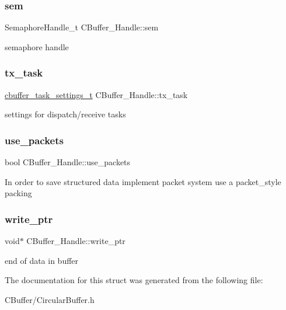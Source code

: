 \subsubsection{\texorpdfstring{sem}{sem}}
{\footnotesize\ttfamily Semaphore\+Handle\+\_\+t C\+Buffer\+\_\+\+Handle\+::sem}

semaphore handle \mbox{\label{structCBuffer__Handle_acf4f92865eae15d0c64e94550bb0ac9a}} 
\subsubsection{\texorpdfstring{tx\+\_\+task}{tx\_task}}
{\footnotesize\ttfamily \hyperlink{structCBuffer__tasks}{cbuffer\+\_\+task\+\_\+settings\+\_\+t} C\+Buffer\+\_\+\+Handle\+::tx\+\_\+task}

settings for dispatch/receive tasks \mbox{\label{structCBuffer__Handle_ad6156a0a6134052e1620d8cd9fb5154b}} 
\subsubsection{\texorpdfstring{use\+\_\+packets}{use\_packets}}
{\footnotesize\ttfamily bool C\+Buffer\+\_\+\+Handle\+::use\+\_\+packets}

In order to save structured data implement packet system use a packet\+\_\+style packing \mbox{\label{structCBuffer__Handle_a301255119721b1cc76531ffc045594fb}} 
\subsubsection{\texorpdfstring{write\+\_\+ptr}{write\_ptr}}
{\footnotesize\ttfamily void$\ast$ C\+Buffer\+\_\+\+Handle\+::write\+\_\+ptr}

end of data in buffer 

The documentation for this struct was generated from the following file\+:\begin{DoxyCompactItemize}
\item 
C\+Buffer/Circular\+Buffer.\+h\end{DoxyCompactItemize}
